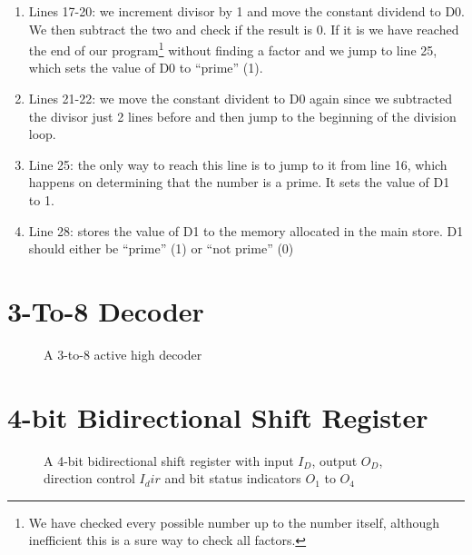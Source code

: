 \documentclass[11pt]{article} %
\begin{document}
\begin{enumerate}[(a)]
\begin{enumerate}
\begin{enumerate}
			\item Lines 17-20: we increment divisor by 1 and move the constant dividend to D0. We then subtract the two and check if the result is 0. If it is we have reached the end of our program\footnote{We have checked every possible number up to the number itself, although inefficient this is a sure way to check all factors.} without finding a factor and we jump to line 25, which sets the value of D0 to ``prime'' (1).
			\item Lines 21-22: we move the constant divident to D0 again since we subtracted the divisor just 2 lines before and then jump to the beginning of the division loop.
			\item Line 25: the only way to reach this line is to jump to it from line 16, which happens on determining that the number is a prime. It sets the value of D1 to 1.
			\item Line 28: stores the value of D1 to the memory allocated in the main store. D1 should either be ``prime'' (1) or ``not prime'' (0)
		\end{enumerate}
	\end{enumerate}
\end{enumerate}
\appendix
\newpage
\section{3-To-8 Decoder}
\label{a:q1}
\begin{figure}[htbp]
  \centering
  \label{g:3-to-8-double}
  \caption{A 3-to-8 active high decoder}
\end{figure}
\newpage
\section{4-bit Bidirectional Shift Register}
\label{a:q2}
\begin{figure}[htbp]
  \centering
  \label{g:4-bit-register}
  \caption{A 4-bit bidirectional shift register with input $I_D$, output $O_D$, direction control $I_dir$ and bit status indicators $O_1$ to $O_4$}
\end{figure}

\newpage
\end{document}
